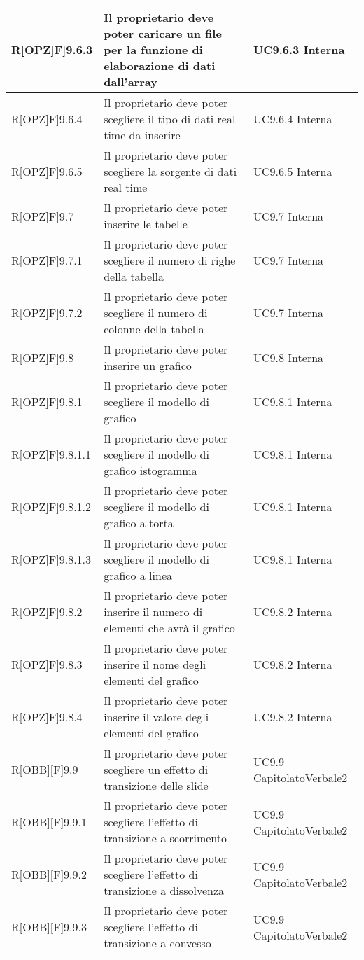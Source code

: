 	\begin{table}[h]
		\begin{tabular}{|p{}|p{}|p{}|}
			\midrule

			R[OPZ]F]9.6.3 & Il proprietario deve poter caricare un file per la funzione di elaborazione di dati dall'array & UC9.6.3 Interna\\ \midrule 
			R[OPZ]F]9.6.4 & Il proprietario deve poter scegliere il tipo di dati real time da inserire & UC9.6.4 Interna\\ \midrule 
			R[OPZ]F]9.6.5 & Il proprietario deve poter scegliere la sorgente di dati real time & UC9.6.5 Interna\\ \midrule 
			R[OPZ]F]9.7 & Il proprietario deve poter inserire le tabelle & UC9.7 Interna\\ \midrule 
			R[OPZ]F]9.7.1 & Il proprietario deve poter scegliere il numero di righe della tabella & UC9.7 Interna\\ \midrule 
			R[OPZ]F]9.7.2 & Il proprietario deve poter scegliere il numero di
			colonne della tabella & UC9.7 Interna\\ \midrule 
			R[OPZ]F]9.8 & Il proprietario deve poter inserire un grafico & UC9.8 Interna\\ \midrule 
			R[OPZ]F]9.8.1 & Il proprietario deve poter scegliere il modello di
			grafico & UC9.8.1 Interna\\ \midrule 
			R[OPZ]F]9.8.1.1 & Il proprietario deve poter scegliere il modello di
			grafico istogramma & UC9.8.1 Interna\\ \midrule 
			R[OPZ]F]9.8.1.2 & Il proprietario deve poter scegliere il modello di
			grafico a torta & UC9.8.1 Interna\\ \midrule 
			R[OPZ]F]9.8.1.3 & Il proprietario deve poter scegliere il modello di grafico a linea & UC9.8.1 Interna\\ \midrule 
			R[OPZ]F]9.8.2 & Il proprietario deve poter inserire il numero di
			elementi che avrà il grafico & UC9.8.2 Interna\\ \midrule 
			R[OPZ]F]9.8.3 & Il proprietario deve poter inserire il nome degli elementi del grafico & UC9.8.2 Interna\\ \midrule 
			R[OPZ]F]9.8.4 & Il proprietario deve poter inserire il valore degli elementi del grafico & UC9.8.2 Interna\\ \midrule 
			R[OBB][F]9.9 & Il proprietario deve poter scegliere un effetto di transizione delle slide & UC9.9 Capitolato\newline Verbale2\\ \midrule 
			R[OBB][F]9.9.1 & Il proprietario deve poter scegliere l'effetto di
			transizione a scorrimento & UC9.9 Capitolato\newline Verbale2\\ \midrule 
			R[OBB][F]9.9.2 & Il proprietario deve poter scegliere l'effetto di
			transizione a dissolvenza & UC9.9 Capitolato\newline Verbale2\\ \midrule 
			R[OBB][F]9.9.3 & Il proprietario deve poter scegliere l'effetto di transizione a convesso & UC9.9 Capitolato\newline Verbale2\\ \midrule


\end{tabular}
\end{table}
